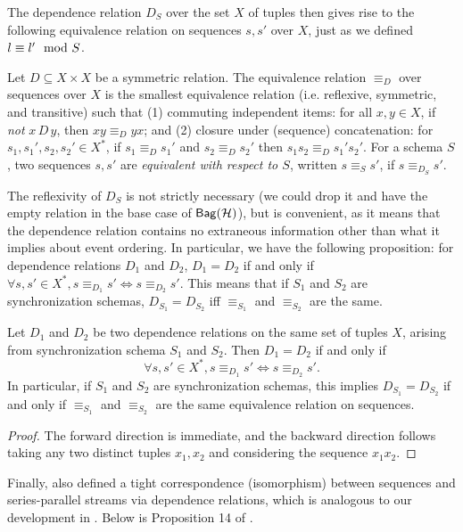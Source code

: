The dependence relation $D_{S}$ over the set $X$ of tuples then gives rise to the following equivalence relation on sequences
$s, s'$ over $X$,
just as we defined $l \equiv l' \mod {S}$.
\begin{definition}
    Let $D \subseteq X \times X$ be a symmetric relation.
    The equivalence relation $\equiv_D$ over sequences over $X$ is
    the smallest equivalence relation (i.e. reflexive, symmetric, and transitive) such that (1)
    commuting independent items: for all $x, y \in X$, if \emph{not} $x\, D\, y$, then $x y \equiv_D y x$;
    and (2) closure under (sequence) concatenation: for $s_1, s_1', s_2, s_2' \in X^{*}$, if $s_1 \equiv_D s_1'$ and $s_2 \equiv_D s_2'$ then $s_1 s_2 \equiv_D s_1' s_2'$.
    For a schema $S$, two sequences $s, s'$ are \emph{equivalent with respect to $S$}, written $s \equiv_S s'$, if $s \equiv_{D_S} s'$.
    \end{definition}

The reflexivity of $D_{S}$ is not strictly necessary (we could drop it and have the empty relation in the base case of $\mathsf{Bag}({\mathcal{H}})$), but is convenient, as it means that the dependence relation contains no extraneous information other than what it implies about event ordering.
In particular,
we have the following proposition:
for dependence relations $D_1$ and $D_2$, $D_1 = D_2$ if and only if
$\forall s, s' \in X^{*}, s \equiv_{D_1} s' \iff s \equiv_{D_2} s'$.
This means that if $S_1$ and $S_2$ are synchronization schemas,
$D_{S_1} = D_{S_2}$ iff $\equiv_{S_1}$ and $\equiv_{S_2}$ are the same.

\begin{proposition}
\label{prop:why-reflexive}
Let $D_1$ and $D_2$ be two dependence relations on the same set of tuples $X$,
arising from synchronization schema $S_1$ and $S_2$.
Then $D_1 = D_2$ if and only if
\[
    \forall s, s' \in X^{*}, s \equiv_{D_1} s' \iff s \equiv_{D_2} s'.
\]
In particular, if $S_1$ and $S_2$ are synchronization schemas, this implies
$D_{S_1} = D_{S_2}$ if and only if $\equiv_{S_1}$ and $\equiv_{S_2}$ are the same equivalence relation on sequences.
\end{proposition}
\begin{proof}
The forward direction is immediate, and the backward direction follows
taking any two distinct tuples $x_1, x_2$ and considering the sequence $x_1 x_2$.
\end{proof}

Finally,  also defined a tight correspondence (isomorphism)
between sequences and series-parallel streams via dependence relations,
which is analogous to our development in .
Below is Proposition 14 of .

